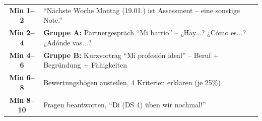 \documentclass[11pt, a4paper]{article}
\begin{document}
\normalsize
\vspace{0.2cm}


\begin{tcolorbox}[
    colback=wichtig!10,
    colframe=wichtig,
    title={\footnotesize\bfseries Assessment-Ankündigung (10 Min, Min 35--45)},
    fonttitle=\bfseries,
    boxrule=0.5pt,
    top=2pt, bottom=2pt, left=4pt, right=4pt
]
\footnotesize
\begin{tabularx}{\textwidth}{@{}cX@{}}
\textbf{Min 1--2} & ``Nächste Woche Montag (19.01.) ist Assessment -- eine sonstige Note.'' \\
\textbf{Min 2--4} & \textbf{Gruppe A:} Partnergespräch ``Mi barrio'' -- ¿Hay...? ¿Cómo es...? ¿Adónde vas...? \\
\textbf{Min 4--6} & \textbf{Gruppe B:} Kurzvortrag ``Mi profesión ideal'' -- Beruf + Begründung + Fähigkeiten \\
\textbf{Min 6--8} & Bewertungsbögen austeilen, 4 Kriterien erklären (je 25\%) \\
\textbf{Min 8--10} & Fragen beantworten, ``Di (DS 4) üben wir nochmal!'' \\
\end{tabularx}
\end{tcolorbox}

\vspace{0.2cm}

\end{document}
